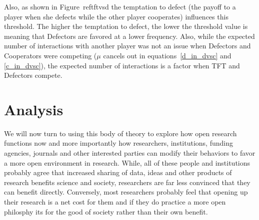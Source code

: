 \documentclass[11pt]{article} %
\begin{document}
Also, as shown in Figure~ref{tftvsd} the temptation to defect (the payoff to a player when she defects while the other player cooperates) influences this threshold. The higher the temptation to defect, the lower the threshold value is meaning that Defectors are favored at a lower frequency. Also, while the expected number of interactions with another player was not an issue when Defectors and Cooperators were competing ($\mu$ cancels out in equations~\ref{d_in_dvsc} and \ref{c_in_dvsc}), the expected number of interactions is a factor when TFT and Defectors compete. 

\section{Analysis}
We will now turn to using this body of theory to explore how open research functions now and more importantly how researchers, institutions, funding agencies, journals and other interested parties can modify their behaviors to favor a more open environment in research. While, all of these people and institutions probably agree that increased sharing of data, ideas and other products of research benefits science and society, researchers are far less convinced that they can benefit directly. Conversely, most researchers probably feel that opening up their research is a net cost for them and if they do practice a more open philosphy its for the good of society rather than their own benefit.





\end{document}
